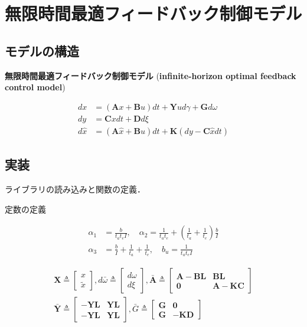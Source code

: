\section{無限時間最適フィードバック制御モデル}
\subsection{モデルの構造}
\textbf{無限時間最適フィードバック制御モデル} (\textbf{infinite-horizon optimal feedback control model}) \citep{Qian2013-zy}


\begin{align}
d x&=(\mathbf{A} x+\mathbf{B} u) dt +\mathbf{Y} u d \gamma+\mathbf{G} d \omega \\
d y&=\mathbf{C} x dt+\mathbf{D} d \xi\\
d \hat{x}&=(\mathbf{A} \hat{x}+\mathbf{B} u) dt+\mathbf{K}(dy-\mathbf{C} \hat{x} dt)
\end{align}
\subsection{実装}
ライブラリの読み込みと関数の定義．

定数の定義


\begin{align}
\alpha_{1}&=\frac{b}{t_{a} t_{e} I},\quad \alpha_{2}=\frac{1}{t_{a} t_{e}}+\left(\frac{1}{t_{a}}+\frac{1}{t_{e}}\right) \frac{b}{I} \\
\alpha_{3}&=\frac{b}{I}+\frac{1}{t_{a}}+\frac{1}{t_{e}},\quad b_{u}=\frac{1}{t_{a} t_{e} I}
\end{align}


\begin{align}
\mathbf{X}\triangleq\begin{bmatrix}
x \\
\tilde{x}
\end{bmatrix}, d \bar{\omega} \triangleq\begin{bmatrix}
d \omega \\
d \xi
\end{bmatrix}, \bar{\mathbf{A}} \triangleq\begin{bmatrix}
\mathbf{A}-\mathbf{B} \mathbf{L} & \mathbf{B} \mathbf{L} \\
\mathbf{0} & \mathbf{A}-\mathbf{K} \mathbf{C}
\end{bmatrix}\\
\bar{\mathbf{Y}} \triangleq\begin{bmatrix}
-\mathbf{Y} \mathbf{L} & \mathbf{Y} \mathbf{L} \\
-\mathbf{Y} \mathbf{L} & \mathbf{Y} \mathbf{L}
\end{bmatrix}, \bar{G} \triangleq\begin{bmatrix}
\mathbf{G} & \mathbf{0} \\
\mathbf{G} & -\mathbf{K} \mathbf{D}
\end{bmatrix}
\end{align}


